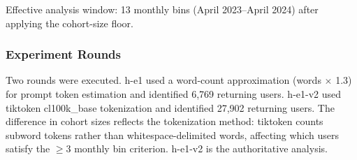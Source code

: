 Effective analysis window: 13 monthly bins (April 2023--April 2024) after applying the cohort-size floor.

\subsubsection{Experiment Rounds}

Two rounds were executed. h-e1 used a word-count approximation (words $\times$ 1.3) for prompt token estimation and identified 6,769 returning users. h-e1-v2 used tiktoken cl100k\_base tokenization and identified 27,902 returning users. The difference in cohort sizes reflects the tokenization method: tiktoken counts subword tokens rather than whitespace-delimited words, affecting which users satisfy the $\geq 3$ monthly bin criterion. h-e1-v2 is the authoritative analysis.

